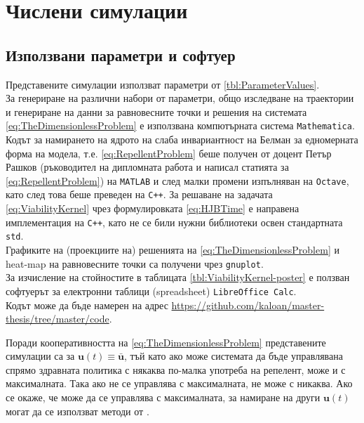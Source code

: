 \section{\hspace{1em} Числени симулации}

\subsection{Използвани параметри и софтуер}
Представените симулации използват параметри от \ref{tbl:ParameterValues}. \\
За генериране на различни набори от параметри, общо изследване на траектории и генериране на данни за равновесните точки и решения на системата \eqref{eq:TheDimensionlessProblem} е използвана компютърната система \texttt{Mathematica}. \\
Кодът за намирането на ядрото на слаба инвариантност на Белман за едномерната форма на модела, т.е. \eqref{eq:RepellentProblem} беше получен от доцент Петър Рашков (ръководител на дипломната работа и написал статията \cite{Rashkov2022} за \eqref{eq:RepellentProblem}) на \texttt{MATLAB} и след малки промени изпълняван на \texttt{Octave}, като след това беше преведен на \texttt{C++}.
За решаване на задачата \eqref{eq:ViabilityKernel} чрез формулировката \eqref{eq:HJBTime} е направена имплементация на \texttt{C++}, като не се били нужни библиотеки освен стандартната \texttt{std}. \\
Графиките на (проекциите на) решенията на \eqref{eq:TheDimensionlessProblem} и heat-map на равновесните точки са получени чрез \texttt{gnuplot}. \\
За изчисление на стойностите в таблицата \ref{tbl:ViabilityKernel-poster} е ползван софтуерът за електронни таблици (spreadsheet) \texttt{LibreOffice Calc}. \\
Кодът може да бъде намерен на адрес \url{https://github.com/kaloan/master-thesis/tree/master/code}.

\begin{remark}
  Поради кооперативността на \eqref{eq:TheDimensionlessProblem} представените симулации са за $\mathbf{u}(t) \equiv \bar{\mathbf{u}}$, тъй като ако може системата да бъде управлявана спрямо здравната политика с някаква по-малка употреба на репелент, може и с максималната.
  Така ако не се управлява с максималната, не може с никаква.
  Ако се окаже, че може да се управлява с максималната, за намиране на други $\mathbf{u}(t)$ могат да се използват методи от \cite{Assellaou2016, Assellaou2018}.
\end{remark}

